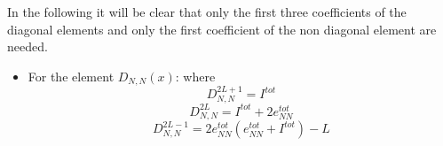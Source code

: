 \documentclass[10pt]{article}
\numberwithin{equation}{section}
\numberwithin{equation}{subsection}
\begin{document}
In the following it will be clear that only the first three coefficients of the diagonal elements and only the first coefficient of the non diagonal element are needed. 
\begin{itemize}
	\item For the element $D_{N,N}(x)$: 
where 
\begin{equation}
	D_{N,N}^{2L+1}=I^{tot}
\end{equation}
\begin{equation}
	D_{N,N}^{2L}=I^{tot}+2e_{NN}^{tot}
\end{equation}
\begin{equation}
	D_{N,N}^{2L-1}	=2e_{NN}^{tot}\left(e_{NN}^{tot}+I^{tot}\right)-L
\end{equation}

\end{itemize}
\end{document}
